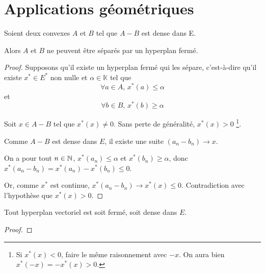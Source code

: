 \section{Applications géométriques}

\begin{corollary}
	Soient deux convexes $A$ et $B$ tel que $A-B$ est dense dans E.

	Alors $A$ et $B$ ne peuvent être séparés par un hyperplan fermé.
\end{corollary}

\ifdefined\outputproof
\begin{proof}
	Supposons qu'il existe un hyperplan fermé qui les sépare, c'est-à-dire qu'il
	existe $x^{*} \in E^{*}$ non nulle et $\alpha \in \mathbb{K}$ tel que
	\begin{equation}
		\forall a \in A, \, x^{*}(a) \leq \alpha
	\end{equation}
	et
	\begin{equation}
		\forall b \in B, \, x^{*}(b) \geq \alpha
	\end{equation}

	Soit $x \in A - B$ tel que $x^{*}(x) \neq 0$. Sans perte de généralité,
	$x^{*}(x) > 0$
	\footnote{Si $x^{*}(x) < 0$, faire le même raisonnement avec $-x$. On aura
	bien $x^{*}(-x) = -x^{*}(x) > 0$.}.
	
	Comme $A - B$ est dense dans $E$, il existe une suite $(a_{n} - b_{n}) \rightarrow x$.

	On a pour tout $n \in \mathbb{N}$, $x^{*}(a_{n}) \leq \alpha$ et $x^{*}(b_{n})
	\geq \alpha$, donc $x^{*}(a_{n} - b_{n}) = x^{*}(a_{n}) - x^{*}(b_{n}) \leq
	0$.

	Or, comme $x^{*}$ est continue, $x^{*}(a_{n} - b_{n}) \rightarrow x^{*}(x)
	\leq 0$. Contradiction avec l'hypothèse que $x^{*}(x) > 0$.
\end{proof}
\fi

\begin{corollary}
	Tout hyperplan vectoriel est soit fermé, soit dense dans $E$.
\end{corollary}

\ifdefined\outputproof
\begin{proof}

\end{proof}
\fi
